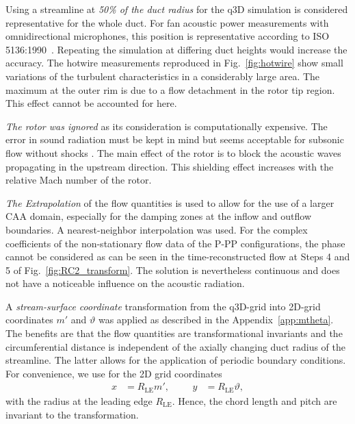 \begin{description}
\item{Using a streamline at \textit{50\% of the duct radius}}
	for the q3D simulation is considered representative for the whole duct. For fan acoustic power measurements with omnidirectional microphones, this position is representative according to ISO 5136:1990~\cite{barret_noise_1960,arnold_experimentelle_1999}. Repeating the simulation at differing duct heights would increase the accuracy. The hotwire measurements reproduced in Fig.~\ref{fig:hotwire} show small variations of the turbulent characteristics in a considerably large area.  The maximum at the outer rim is due to a flow detachment in the rotor tip region. This effect cannot be accounted for here.
\item{\textit{The rotor was ignored}}
	as its consideration is computationally expensive. The error in sound radiation must be kept in mind but seems acceptable for subsonic flow without shocks \cite{moreau_impact_2016}. The main effect of the rotor is to block the acoustic waves propagating in the upstream direction. This shielding effect increases with the relative  Mach number of the rotor.    
\item{\textit{The Extrapolation}}
	of the flow quantities is used to allow for the use of a larger CAA domain, especially for the damping zones at the inflow and outflow boundaries. A nearest-neighbor interpolation was used. For the complex coefficients of the non-stationary flow data of the P-PP configurations, the phase cannot be considered as can be seen in the time-reconstructed flow at Steps 4 and 5 of Fig.~\ref{fig:RC2_transform}. The solution is nevertheless continuous and does not have a noticeable influence on the acoustic radiation.
\item{A \textit{stream-surface coordinate}}
	transformation from the q3D-grid into 2D-grid coordinates $m'$ and $\vartheta$ was applied as described in the Appendix~\ref{app:mtheta}. 
	 The benefits are that the flow quantities are transformational invariants and the circumferential distance is independent of the axially changing duct radius of the streamline. The latter allows for the application of periodic boundary conditions. For convenience, we use for the 2D grid coordinates
	\begin{align}
	x &= R_\text{LE} m', &&& y &= R_\text{LE} \vartheta,
	\end{align}
	with the radius at the leading edge $R_\text{LE}$. Hence, the chord length and pitch are invariant to the transformation.
\end{description}


